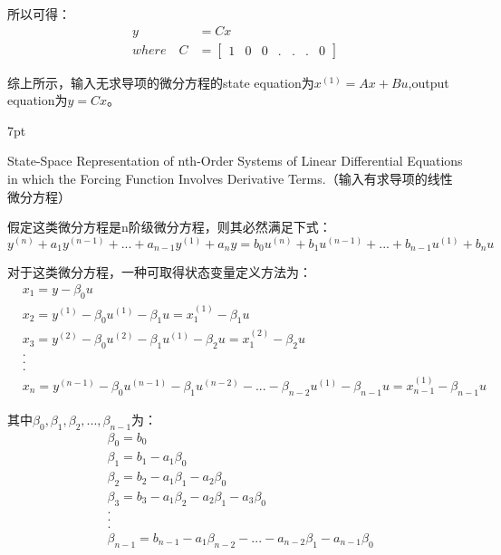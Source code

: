 \documentclass{article}
\numberwithin{equation}{section}
\numberwithin{figure}{section}
\newenvironment{formal}{%
\def\FrameCommand{%
\hspace{1pt}%
{\color{DarkBlue}\vrule width 2pt}%
{\color{formalshade}\vrule width 4pt}%
\colorbox{formalshade}%
}%
\MakeFramed{\advance\hsize-\width\FrameRestore}%
\noindent\hspace{-4.55pt}%
\begin{adjustwidth}{}{7pt}%
\vspace{2pt}\vspace{2pt}%
}
{%
\vspace{2pt}\end{adjustwidth}\endMakeFramed%
}
\begin{document}
所以可得：
\begin{equation}
    \begin{split}
        y&=Cx\\
        where \quad C&=
        \begin{bmatrix}
            1&0&0&.&.&.&0
        \end{bmatrix}
    \end{split}
\end{equation}

综上所示，输入无求导项的微分方程的state equation为$x^{(1)}=Ax+Bu$,output equation为$y=Cx$。


\begin{formal}
    State-Space Representation of nth-Order Systems of Linear Differential Equations in which the Forcing Function Involves Derivative Terms.（输入有求导项的线性微分方程）
\end{formal}

假定这类微分方程是n阶级微分方程，则其必然满足下式：
\begin{equation}
    y^{(n)}+a_1y^{(n-1)}+...+a_{n-1}y^{(1)}+a_ny=b_0u^{(n)}+b_1u^{(n-1)}+...+b_{n-1}u^{(1)}+b_nu
\end{equation}

对于这类微分方程，一种可取得状态变量定义方法为：
\begin{equation}
    \begin{split}
        &x_1=y-\beta_0u\\
        &x_2=y^{(1)}-\beta_0u^{(1)}-\beta_1u=x^{(1)}_1-\beta_1u\\
        &x_3=y^{(2)}-\beta_0u^{(2)}-\beta_1u^{(1)}-\beta_2u=x^{(2)}_1-\beta_2u\\
        &.\\
        &.\\
        &.\\
        &x_n=y^{(n-1)}-\beta_0u^{(n-1)}-\beta_1u^{(n-2)}-...-\beta_{n-2}u^{(1)}-\beta_{n-1}u=x^{(1)}_{n-1}-\beta_{n-1}u
    \end{split}
\end{equation}

其中$\beta_0,\beta_1,\beta_2,...,\beta_{n-1}$为：
\begin{equation}
    \begin{split}
        &\beta_0=b_0\\
        &\beta_1=b_1-a_1\beta_0\\
        &\beta_2=b_2-a_1\beta_1-a_2\beta_0\\
        &\beta_3=b_3-a_1\beta_2-a_2\beta_1-a_3\beta_0\\
        &.\\
        &.\\
        &.\\
        &\beta_{n-1}=b_{n-1}-a_1\beta_{n-2}-...-a_{n-2}\beta_1-a_{n-1}\beta_0
    \end{split}
\end{equation}
\end{document}
